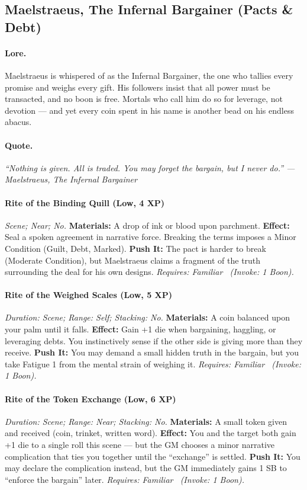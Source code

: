 \subsection{Maelstraeus, The Infernal Bargainer (Pacts \& Debt)}
\paragraph{Lore.}  
Maelstraeus is whispered of as the Infernal Bargainer, the one who tallies every promise and weighs every gift. His followers insist that all power must be transacted, and no boon is free. Mortals who call him do so for leverage, not devotion — and yet every coin spent in his name is another bead on his endless abacus.  

\paragraph{Quote.}  
\emph{“Nothing is given. All is traded. You may forget the bargain, but I never do.” — Maelstraeus, The Infernal Bargainer}  



\paragraph{Rite of the Binding Quill (Low, 4 XP)} 
\emph{Scene; Near; No.}  
\textbf{Materials:} A drop of ink or blood upon parchment.  
\textbf{Effect:} Seal a spoken agreement in narrative force. Breaking the terms imposes a Minor Condition (Guilt, Debt, Marked).  
\textbf{Push It:} The pact is harder to break (Moderate Condition), but Maelstraeus claims a fragment of the truth surrounding the deal for his own designs.  
\emph{Requires: Familiar \ (\textit{Invoke:} 1 Boon).}  

\paragraph{Rite of the Weighed Scales (Low, 5 XP)}  
\emph{Duration: Scene; Range: Self; Stacking: No.}  
\textbf{Materials:} A coin balanced upon your palm until it falls.  
\textbf{Effect:} Gain +1 die when bargaining, haggling, or leveraging debts. You instinctively sense if the other side is giving more than they receive.  
\textbf{Push It:} You may demand a small hidden truth in the bargain, but you take Fatigue 1 from the mental strain of weighing it.  
\emph{Requires: Familiar \ (\textit{Invoke:} 1 Boon).}  

\paragraph{Rite of the Token Exchange (Low, 6 XP)}  
\emph{Duration: Scene; Range: Near; Stacking: No.}  
\textbf{Materials:} A small token given and received (coin, trinket, written word).  
\textbf{Effect:} You and the target both gain +1 die to a single roll this scene — but the GM chooses a minor narrative complication that ties you together until the “exchange” is settled.  
\textbf{Push It:} You may declare the complication instead, but the GM immediately gains 1 SB to “enforce the bargain” later.  
\emph{Requires: Familiar \ (\textit{Invoke:} 1 Boon).}  

